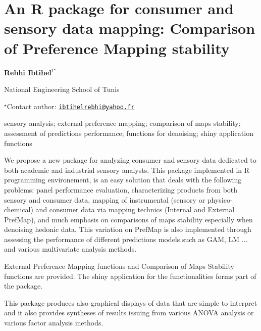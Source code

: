 \documentclass[\main/boa.tex]{subfiles}
\begin{document}
\section{An R package for consumer and sensory data mapping: Comparison of Preference Mapping stability}

\begin{center}
  {\bf {} Rebhi Ibtihel$^{1^\star}$}
\end{center}

\vskip 0.3cm

\begin{affiliations}
\begin{enumerate}
\begin{minipage}{0.915\textwidth}
\centering
\item National Engineering School of Tunis \\[-2pt]
\end{minipage}
\end{enumerate}
$^\star$Contact author: \href{mailto:ibtihelrebhi@yahoo.fr}{\nolinkurl{ibtihelrebhi@yahoo.fr}}\\
\end{affiliations}

\vskip 0.5cm

\begin{minipage}{0.915\textwidth}
\keywords sensory analysis; external preference mapping; comparison of maps stability; assessment of predictions performance; functions for denoising; shiny application
functions
\end{minipage}

\vskip 0.8cm

We propose a new package for analyzing consumer and sensory data dedicated to both academic and industrial sensory analysts. This package implemented in R programming environement, is an easy solution that deals with the following problems: panel performance
evaluation, characterizing products from both sensory and consumer data, mapping of instrumental (sensory or physico-chemical) and consumer data via mapping technics (Internal and External PrefMap), and much emphasis on comparisons of maps stability especially when denoising hedonic data. This variation on PrefMap is also implemented through assessing the performance of different predictions models such as GAM, LM ... and various multivariate analysis methods.

External Preference Mapping functions and Comparison of Maps Stability functions are provided. The shiny application for the functionalities forms part of the package.

This package produces also graphical displays of data that are simple to interpret and it also provides syntheses of results issuing from various ANOVA analysis or various factor analysis methods.
\end{document}
